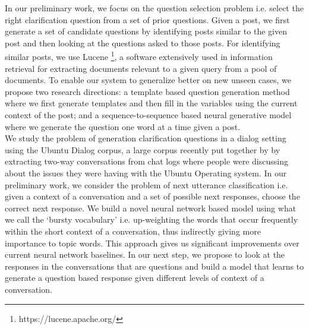 \documentclass[11pt]{report}
\numberwithin{equation}{section}
\begin{document}
\noindent
In our preliminary work, we focus on the question selection problem i.e. select the right clarification question from a set of prior questions. Given a post, we first generate a set of candidate questions by identifying posts similar to the given post and then looking at the questions asked to those posts. For identifying similar posts, we use Lucene \footnote{https://lucene.apache.org/}, a software extensively used in information retrieval for extracting documents relevant to a given query from a pool of documents. To enable our system to generalize better on new unseen cases, we propose two research directions: a template based question generation method where we first generate templates and then fill in the variables using the current context of the post; and a sequence-to-sequence based neural generative model where we generate the question one word at a time given a post.\\

\noindent
We study the problem of generation clarification questions in a dialog setting using the Ubuntu Dialog corpus, a large corpus recently put together by \cite{} by extracting two-way conversations from chat logs where people were discussing about the issues they were having with the Ubuntu Operating system. In our preliminary work, we consider the problem of next utterance classification i.e. given a context of a conversation and a set of possible next responses, choose the correct next response. %
We build a novel neural network based model using what we call the `bursty vocabulary' i.e. up-weighting the words that occur frequently within the short context of a conversation, thus indirectly giving more importance to topic words. This approach gives us significant improvements over current neural network baselines. In our next step, we propose to look at the responses in the conversations that are questions and build a model that learns to generate a question based response given different levels of context of a conversation.
\end{document}
